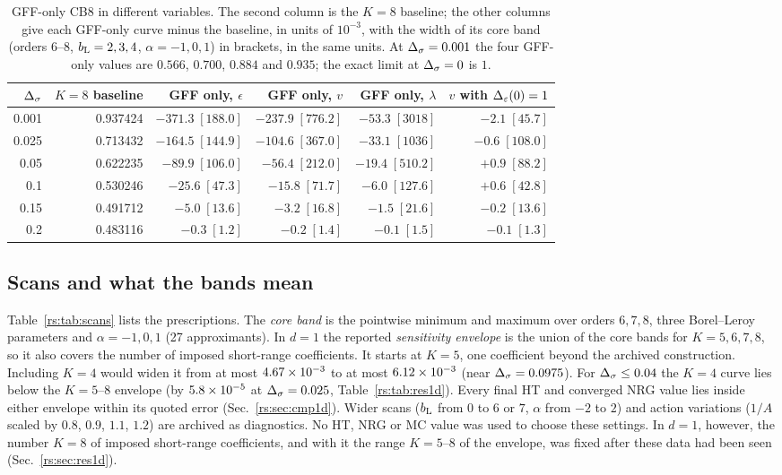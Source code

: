 \begin{table}[htbp]\centering\small
\begin{tabular}{@{}r r r r r r@{}}
\toprule
$\Delta_\sigma$ & $K=8$ baseline & GFF only, $\epsilon$ & GFF only, $v$ & GFF only, $\lambda$ & $v$ with $\Delta_\varepsilon(0)=1$\\ \midrule
0.001 & 0.937424 & $-371.3\;[188.0]$ & $-237.9\;[776.2]$ & $-53.3\;[3018]$ & $-2.1\;[45.7]$\\
0.025 & 0.713432 & $-164.5\;[144.9]$ & $-104.6\;[367.0]$ & $-33.1\;[1036]$ & $-0.6\;[108.0]$\\
0.05 & 0.622235 & $-89.9\;[106.0]$ & $-56.4\;[212.0]$ & $-19.4\;[510.2]$ & $+0.9\;[88.2]$\\
0.1 & 0.530246 & $-25.6\;[47.3]$ & $-15.8\;[71.7]$ & $-6.0\;[127.6]$ & $+0.6\;[42.8]$\\
0.15 & 0.491712 & $-5.0\;[13.6]$ & $-3.2\;[16.8]$ & $-1.5\;[21.6]$ & $-0.2\;[13.6]$\\
0.2 & 0.483116 & $-0.3\;[1.2]$ & $-0.2\;[1.4]$ & $-0.1\;[1.5]$ & $-0.1\;[1.3]$\\
\bottomrule
\end{tabular}
\caption{GFF-only CB8 in different variables. The second column is the $K=8$ baseline; the
other columns give each GFF-only curve minus the baseline, in units of $10^{-3}$, with the
width of its core band (orders $6$--$8$, $b_{\mathrm L}=2,3,4$, $\alpha=-1,0,1$) in brackets, in the
same units. At $\Delta_\sigma=0.001$ the four GFF-only values are $0.566$,
$0.700$, $0.884$ and $0.935$; the exact limit at $\Delta_\sigma=0$ is $1$.}
\label{rs:tab:gffonly}
\end{table}

\subsection{Scans and what the bands mean}\label{rs:sec:scans}
Table~\ref{rs:tab:scans} lists the prescriptions. The \emph{core band} is the pointwise
minimum and maximum over orders $6,7,8$, three Borel--Leroy parameters and
$\alpha=-1,0,1$ (27 approximants). In $d=1$ the reported \emph{sensitivity envelope} is
the union of the core bands for $K=5,6,7,8$, so it also covers the number of imposed
short-range coefficients. It starts at $K=5$, one coefficient beyond the archived
construction. Including $K=4$ would widen it from at most $4.67\times10^{-3}$ to at most
$6.12\times10^{-3}$ (near $\Delta_\sigma=0.0975$). For $\Delta_\sigma\le0.04$ the $K=4$ curve lies below the
$K=5$--$8$ envelope (by $5.8\times10^{-5}$ at $\Delta_\sigma=0.025$, Table~\ref{rs:tab:res1d}). Every final HT
and converged NRG value lies inside either envelope within its quoted error
(Sec.~\ref{rs:sec:cmp1d}). Wider scans ($b_{\mathrm L}$ from $0$ to $6$ or $7$, $\alpha$ from $-2$ to $2$)
and action variations ($1/A$ scaled by $0.8$, $0.9$, $1.1$, $1.2$) are archived as
diagnostics. No HT, NRG or MC value was used to choose these settings. In $d=1$, however,
the number $K=8$ of imposed short-range coefficients, and with it the range $K=5$--$8$ of the
envelope, was fixed after these data had been seen (Sec.~\ref{rs:sec:res1d}).


